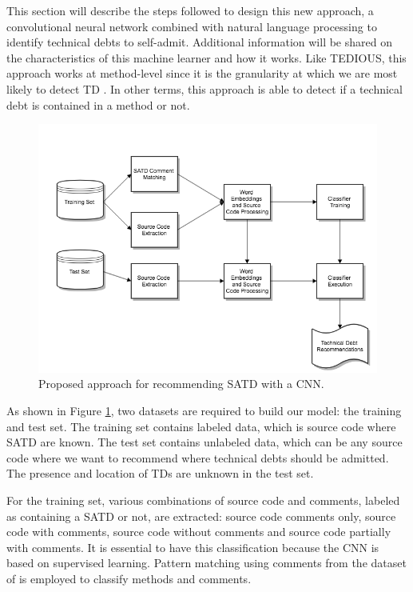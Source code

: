 
This section will describe the steps followed to design this new approach, a convolutional neural network combined with natural language processing to identify technical debts to self-admit. Additional information will be shared on the characteristics of this machine learner and how it works. Like TEDIOUS, this approach works at method-level since it is the granularity at which we are most likely to detect TD \citep{PotdarS14}. In other terms, this approach is able to detect if a technical debt is contained in a method or not.

\begin{figure}[t]
	\centering
	\includegraphics[width=\linewidth]{figs/CNN.png}
	\caption{Proposed approach for recommending SATD with a CNN.}
	\label{fig:CNN}
	\vspace{-4mm}
\end{figure}

As shown in Figure \ref{fig:CNN}, two datasets are required to build our model: the training and test set. The training set contains labeled data, which is source code where SATD are known. The test set contains unlabeled data, which can be any source code where we want to recommend where technical debts should be admitted. The presence and location of TDs are unknown in the test set.

For the training set, various combinations of source code and comments, labeled as containing a SATD or not, are extracted: source code comments only, source code with comments, source code without comments and source code partially with comments. It is essential to have this classification because the CNN is based on supervised learning. Pattern matching using comments from the dataset of \citet{maldonado17} is employed to classify methods and comments.

